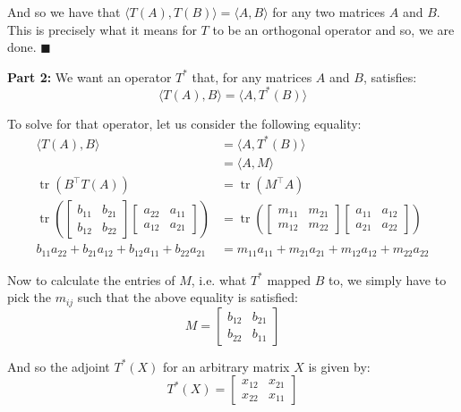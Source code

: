 \documentclass{article}
\begin{document}
And so we have that $\langle T(A),T(B)\rangle = \langle A,B\rangle$ for any two matrices $A$ and $B$. This is precisely what it means for $T$ to be an orthogonal operator and so, we are done. $\blacksquare$
\bigskip


\noindent\textbf{Part 2:} We want an operator $T^*$ that, for any matrices $A$ and $B$, satisfies:
$$\langle T(A),B\rangle=\langle A,T^*(B)\rangle$$

To solve for that operator, let us consider the following equality:
\begin{align*}
  \langle T(A),B\rangle&=\langle A,T^*(B)\rangle\\
  &=\langle A,M\rangle\tag{let $M:=T^*(B)$}\\
  \operatorname{tr}(B^\top T(A))&=\operatorname{tr}(M^\top A)\\
  \operatorname{tr}\left(\begin{bmatrix}
    b_{11}&b_{21}\\b_{12}&b_{22}
  \end{bmatrix}\begin{bmatrix}
    a_{22}&a_{11}\\a_{12}&a_{21}
  \end{bmatrix}\right)&=\operatorname{tr}\left(\begin{bmatrix}
    m_{11}&m_{21}\\m_{12}&m_{22}
  \end{bmatrix}\begin{bmatrix}
    a_{11}&a_{12}\\a_{21}&a_{22}
  \end{bmatrix}\right)\\
  b_{11}a_{22}+b_{21}a_{12}+b_{12}a_{11}+b_{22}a_{21}&=m_{11}a_{11}+m_{21}a_{21}+m_{12}a_{12}+m_{22}a_{22}
\end{align*}

Now to calculate the entries of $M$, i.e. what $T^*$ mapped $B$ to, we simply have to pick the $m_{ij}$ such that the above equality is satisfied:
$$M=\begin{bmatrix}
  b_{12}&b_{21}\\b_{22}&b_{11}
\end{bmatrix}$$

And so the adjoint $T^*(X)$ for an arbitrary matrix $X$ is given by:
$$T^*(X)=\begin{bmatrix}
  x_{12}&x_{21}\\x_{22}&x_{11}
\end{bmatrix}$$

\end{document}
